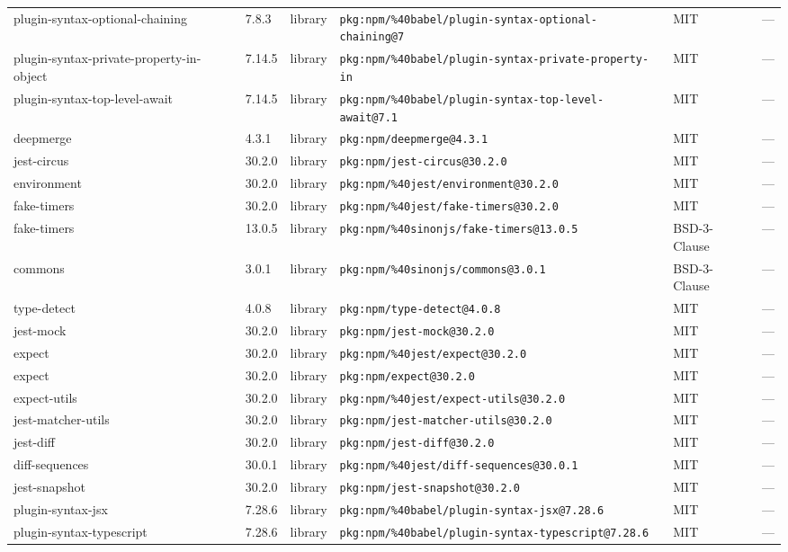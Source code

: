 \documentclass[11pt]{article}
\begin{document}
\begin{longtable}{|l|l|l|p{2.2cm}|l|p{4cm}|}
plugin-syntax-optional-chaining & 7.8.3 & library & \texttt{pkg:npm/\%40babel/plugin-syntax-optional-chaining@7} & MIT & — \\
plugin-syntax-private-property-in-object & 7.14.5 & library & \texttt{pkg:npm/\%40babel/plugin-syntax-private-property-in} & MIT & — \\
plugin-syntax-top-level-await & 7.14.5 & library & \texttt{pkg:npm/\%40babel/plugin-syntax-top-level-await@7.1} & MIT & — \\
deepmerge & 4.3.1 & library & \texttt{pkg:npm/deepmerge@4.3.1} & MIT & — \\
jest-circus & 30.2.0 & library & \texttt{pkg:npm/jest-circus@30.2.0} & MIT & — \\
environment & 30.2.0 & library & \texttt{pkg:npm/\%40jest/environment@30.2.0} & MIT & — \\
fake-timers & 30.2.0 & library & \texttt{pkg:npm/\%40jest/fake-timers@30.2.0} & MIT & — \\
fake-timers & 13.0.5 & library & \texttt{pkg:npm/\%40sinonjs/fake-timers@13.0.5} & BSD-3-Clause & — \\
commons & 3.0.1 & library & \texttt{pkg:npm/\%40sinonjs/commons@3.0.1} & BSD-3-Clause & — \\
type-detect & 4.0.8 & library & \texttt{pkg:npm/type-detect@4.0.8} & MIT & — \\
jest-mock & 30.2.0 & library & \texttt{pkg:npm/jest-mock@30.2.0} & MIT & — \\
expect & 30.2.0 & library & \texttt{pkg:npm/\%40jest/expect@30.2.0} & MIT & — \\
expect & 30.2.0 & library & \texttt{pkg:npm/expect@30.2.0} & MIT & — \\
expect-utils & 30.2.0 & library & \texttt{pkg:npm/\%40jest/expect-utils@30.2.0} & MIT & — \\
jest-matcher-utils & 30.2.0 & library & \texttt{pkg:npm/jest-matcher-utils@30.2.0} & MIT & — \\
jest-diff & 30.2.0 & library & \texttt{pkg:npm/jest-diff@30.2.0} & MIT & — \\
diff-sequences & 30.0.1 & library & \texttt{pkg:npm/\%40jest/diff-sequences@30.0.1} & MIT & — \\
jest-snapshot & 30.2.0 & library & \texttt{pkg:npm/jest-snapshot@30.2.0} & MIT & — \\
plugin-syntax-jsx & 7.28.6 & library & \texttt{pkg:npm/\%40babel/plugin-syntax-jsx@7.28.6} & MIT & — \\
plugin-syntax-typescript & 7.28.6 & library & \texttt{pkg:npm/\%40babel/plugin-syntax-typescript@7.28.6} & MIT & — \\

\end{longtable}
\end{document}
